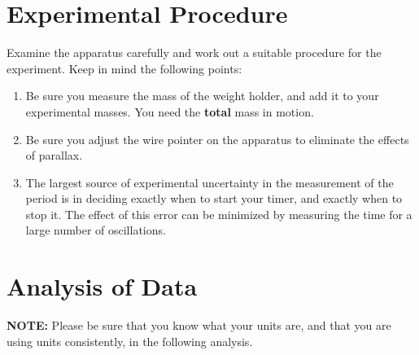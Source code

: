 \section*{Experimental Procedure}
     Examine the apparatus carefully and work out a suitable 
procedure for the experiment.  Keep in mind the following points:
\begin{enumerate}
\item Be sure you measure the mass of the weight holder, and add
it to your experimental masses.  You need the {\bf total} mass in
motion.

\item Be sure you adjust the wire pointer on the apparatus to 
         eliminate the effects of parallax.
\item The largest source of experimental uncertainty in the 
         measurement of the period is in deciding exactly when to 
         start your timer, and exactly when to stop it.  The 
         effect of this error can be minimized by measuring the 
         time for a large number of oscillations.
\end{enumerate}
    
\section*{Analysis of Data}
     {\bf NOTE:}  Please be sure that you know what your units are, and
     that you are using units consistently, in the following
     analysis.

